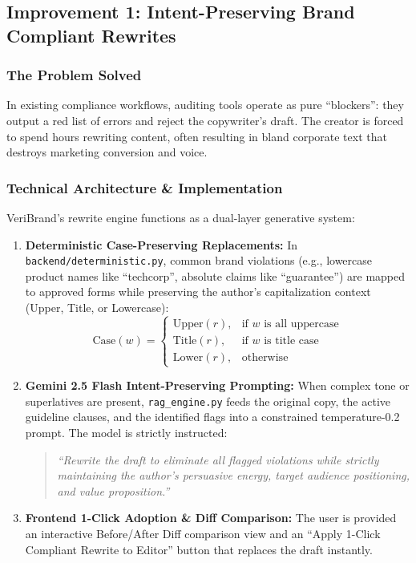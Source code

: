 \documentclass[11pt,a4paper]{article}
\begin{document}
\subsection{Improvement 1: Intent-Preserving Brand Compliant Rewrites}

\subsubsection{The Problem Solved}
In existing compliance workflows, auditing tools operate as pure ``blockers'': they output a red list of errors and reject the copywriter's draft. The creator is forced to spend hours rewriting content, often resulting in bland corporate text that destroys marketing conversion and voice.

\subsubsection{Technical Architecture \& Implementation}
VeriBrand's rewrite engine functions as a dual-layer generative system:
\begin{enumerate}[leftmargin=1cm]
    \item \textbf{Deterministic Case-Preserving Replacements:} In \texttt{backend/deterministic.py}, common brand violations (e.g., lowercase product names like ``techcorp'', absolute claims like ``guarantee'') are mapped to approved forms while preserving the author's capitalization context (Upper, Title, or Lowercase):
    \begin{equation}
        \text{Case}(w) = \begin{cases}
            \text{Upper}(r), & \text{if } w \text{ is all uppercase} \\
            \text{Title}(r), & \text{if } w \text{ is title case} \\
            \text{Lower}(r), & \text{otherwise}
        \end{cases}
    \end{equation}
    \item \textbf{Gemini 2.5 Flash Intent-Preserving Prompting:} When complex tone or superlatives are present, \texttt{rag\_engine.py} feeds the original copy, the active guideline clauses, and the identified flags into a constrained temperature-0.2 prompt. The model is strictly instructed:
    \begin{quote}
        \textit{``Rewrite the draft to eliminate all flagged violations while strictly maintaining the author's persuasive energy, target audience positioning, and value proposition.''}
    \end{quote}
    \item \textbf{Frontend 1-Click Adoption \& Diff Comparison:} The user is provided an interactive Before/After Diff comparison view and an ``Apply 1-Click Compliant Rewrite to Editor'' button that replaces the draft instantly.
\end{enumerate}
\end{document}
